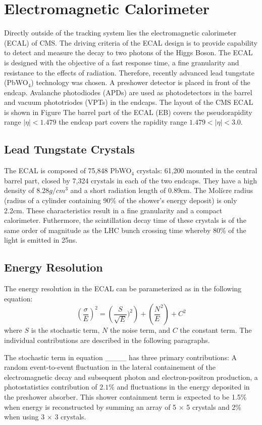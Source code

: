  \section{Electromagnetic Calorimeter}
Directly outside of the tracking system lies the electromagnetic calorimeter 
(ECAL) of CMS. The driving criteria of the ECAL design is to provide capability
to detect and measure the decay to two photons of the Higgs Boson. The 
ECAL is designed with the objective of a
fast response time, a fine granularity and resistance to the effects of radiation.
Therefore, recently advanced lead tungstate (PbWO$_{4}$) technology was chosen. 
A preshower detector is placed in front of the endcap. Avalanche photodiodes (APDs)
are used as photodetectors in the barrel and vacuum phototriodes (VPTs) in the
endcaps.
The layout of the CMS ECAL is shown in Figure %
The barrel part of the ECAL (EB) covers the pseudorapidity range $|\eta|<1.479$
the endcap part covers the rapidity range $1.479<|\eta|<3.0$.
\subsection{Lead Tungstate Crystals}
The ECAL is composed of 75,848 PbWO$_{4}$ crystals: 61,200 mounted in the 
central barrel part, closed by 7,324 crystals in each of the two endcaps. They 
have a high density of 8.28$g/cm^{3}$ and a short radiation length of 0.89cm. 
The Moli$\grave{e}$re radius (radius of a cylinder containing 90\% of the shower's energy deposit) 
is only 2.2cm. These characteristics result in a fine granularity and a compact
calorimeter. Futhermore, the scintillation decay time of these crystals is of the
same order of magnitude as the LHC bunch crossing time whereby 80\% of 
the light is emitted in 25ns. 
\subsection{Energy Resolution}
The energy resolution in the ECAL can be parameterized as in the following equation:
\begin{displaymath}
\left(\frac{\sigma}{E}\right)^{2}=\left(\frac{S}{\sqrt{E}})^{2}\right)+\left(\frac{N}{E}^{2}\right)+C^{2}
\end{displaymath}
where $S$ is the stochastic term, $N$ the noise term, and $C$ the constant term. 
The individual contributions are described in the following paragraphs.

The stochastic term in equation ____ has three primary contributions:%
A random event-to-event fluctuation in the lateral containement of the
electromagnetic decay and subsequent photon and electron-positron production,
a photostatistics contribution of $2.1\%$ and fluctuations in the energy
deposited in the preshower absorber. %
This shower containment term is expected to be 1.5\% when energy is 
reconstructed by summing an array of 5 $\times$ 5 crystals and 2\%
when using 3 $\times$ 3 crystals. 

